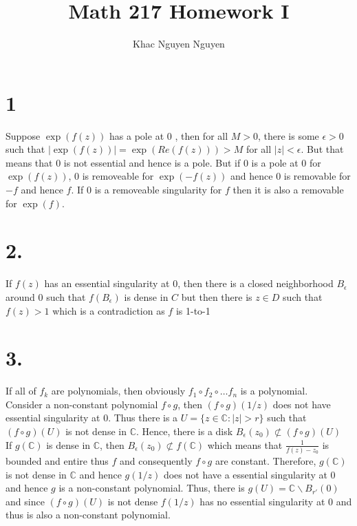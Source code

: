 \documentclass[11pt]{article}
\title{\textbf{Math 217 Homework I}}
\author{Khac Nguyen Nguyen}
\date{}
\begin{document}
\section*{1}
Suppose $\exp(f(z))$ has a pole at 0 , then for all $M > 0$, there is some $\epsilon>0$ such that $|\exp(f(z))| = \exp(Re(f(z)))> M$ for all $|z|<\epsilon$. 
But that means that $0$ is not essential and hence is a pole. But if $0$ is a pole at 0 for $\exp(f(z))$, $0$ is removeable for $\exp(-f(z))$ and hence $0$ is removable for $-f$ and hence $f$. 
If $0$ is a removeable singularity for $f$ then it is also a removable for $\exp(f)$.
\newpage
\section*{2.}
If $f(z)$ has an essential singularity at $0$, then there is a closed neighborhood $B_\epsilon$ around 0  such that $f(B_\epsilon)$ is dense in $C$ but then there is $z \in D$ such that $f(z) > 1$ which is a contradiction as $f$ is 1-to-1
\newpage
\section*{3.}
If all of $f_k$ are polynomials, then obviously $f_1 \circ f_2 \circ \hdots f_n$ is a polynomial. \\ 
Consider a non-constant polynomial $f\circ g$, then $(f \circ g)(1/z)$ does not have essential singularity at 0.
Thus there is a $U = \{z \in \mathbb{C}: |z| > r\}$ such that $(f \circ g)(U)$ is not dense in $\mathbb{C}$. 
Hence, there is a disk $B_{\epsilon}(z_0) \not\subset (f\circ g)(U)$\\
If $g(\mathbb{C})$ is dense in $\mathbb{C}$, then $B_\epsilon(z_0) \not\subset f(\mathbb{C})$ 
which means that $\frac{1}{f(z) -z_0}$ is bounded and entire thus $f$ and consequently $f \circ g$ are constant. 
Therefore, $g(\mathbb{C})$ is not dense in $\mathbb{C}$ and hence $g(1/z)$ does not have a essential singularity at 0 
and hence $g$ is a non-constant polynomial. Thus, there is $g(U) =  \mathbb{C} \backslash B_{r'}(0)$ and since $(f\circ g)(U)$ is not dense 
$f(1/z)$ has no essential singularity at $0$ and thus is also a non-constant polynomial.
\end{document}
